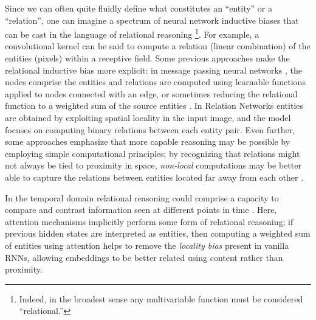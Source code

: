 \documentclass{article}
\begin{document}
Since we can often quite fluidly define what constitutes an ``entity'' or a ``relation'', one can imagine a spectrum of neural network inductive biases that can be cast in the language of relational reasoning \footnote{Indeed, in the broadest sense any multivariable function must be considered ``relational.''}. For example, a convolutional kernel can be said to compute a relation (linear combination) of the entities (pixels) within a receptive field. Some previous approaches make the relational inductive bias more explicit: in message passing neural networks \citep[e.g.][]{gilmer2017neural,scarselli2009graph, LiTBZ15, battaglia2016interaction}, the nodes comprise the entities and relations are computed using learnable functions applied to nodes connected with an edge, or sometimes reducing the relational function to a weighted sum of the source entities \citep[e.g.][]{kipf2016semi, velickovic2018graph}. In Relation Networks \citep{santoro2017simple,raposo2017discovering,hu2017relation} entities are obtained by exploiting spatial locality in the input image, and the model focuses on computing binary relations between each entity pair. Even further, some approaches emphasize that more capable reasoning may be possible by employing simple computational principles; by recognizing that relations might not always be tied to proximity in space, \textit{non-local} computations may be better able to capture the relations between entities located far away from each other \citep{wang2017non,liu2018non}. 

In the temporal domain relational reasoning could comprise a capacity to compare and contrast information seen at different points in time \cite{pavez2018working}. Here, attention mechanisms \citep[e.g.][]{BahdanauCB14,vaswani2017attention} implicitly perform some form of relational reasoning; if previous hidden states are interpreted as entities, then computing a weighted sum of entities using attention helps to remove the \textit{locality bias} present in vanilla RNNs, allowing embeddings to be better related using content rather than proximity. 
\end{document}

